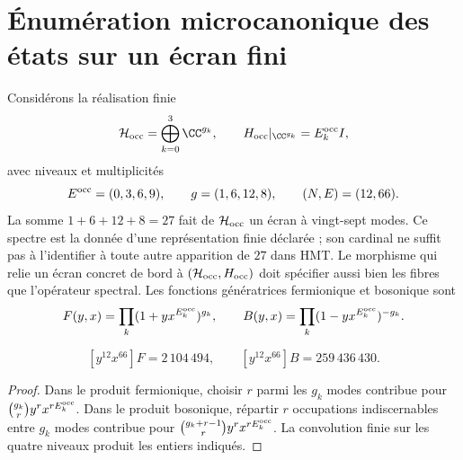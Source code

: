 \section{Énumération microcanonique des états sur un écran fini}
\label{v:v:rec:ocupacion:section:01}

Considérons la réalisation finie
\[
 \mathcal H_{\rm occ}=\bigoplus_{k=0}^{3}\CC^{g_k},
 \qquad
 H_{\rm occ}|_{\CC^{g_k}}=E_k^{\rm occ} I,
\]
avec niveaux et multiplicités
\[
 E^{\rm occ}=(0,3,6,9),\qquad g=(1,6,12,8),
 \qquad(N,E)=(12,66).
\]
La somme \(1+6+12+8=27\) fait de \(\mathcal H_{\rm occ}\) un écran à
vingt-sept modes. Ce spectre est la donnée d’une représentation finie
déclarée ; son cardinal ne suffit pas à l’identifier à toute autre
apparition de \(27\) dans HMT\@. Le morphisme qui relie un écran concret
de bord à \((\mathcal H_{\rm occ},H_{\rm occ})\) doit spécifier aussi bien
les fibres que l’opérateur spectral.
Les fonctions génératrices fermionique et bosonique sont
\[
 F(y,x)=\prod_k(1+yx^{E_k^{\rm occ}})^{g_k},
 \qquad
 B(y,x)=\prod_k(1-yx^{E_k^{\rm occ}})^{-g_k}.
\]

\begin{proposition}
\label{v:v:rec:prop:cardinalidades-microcanonicas}
\[
 [y^{12}x^{66}]F=2\,104\,494,
 \qquad
 [y^{12}x^{66}]B=259\,436\,430.
\]
\end{proposition}
\begin{proof}
Dans le produit fermionique, choisir \(r\) parmi les \(g_k\) modes contribue pour
\(\binom{g_k}{r}y^rx^{rE_k^{\rm occ}}\). Dans le produit bosonique, répartir \(r\)
occupations indiscernables entre \(g_k\) modes contribue pour
\(\binom{g_k+r-1}{r}y^rx^{rE_k^{\rm occ}}\). La convolution finie sur les
quatre niveaux produit les entiers indiqués.
\end{proof}

